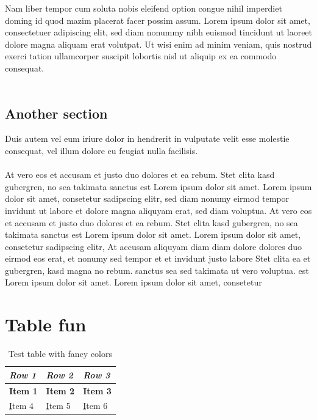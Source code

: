 \documentclass[bibliography=totoc,listof=totoc,BCOR=5mm,DIV=12,oneside]{scrbook}
\begin{document}
Nam liber tempor cum soluta nobis eleifend option congue nihil imperdiet doming id quod mazim placerat facer possim assum. Lorem ipsum dolor sit amet, consectetuer adipiscing elit, sed diam nonummy nibh euismod tincidunt ut laoreet dolore magna aliquam erat volutpat. Ut wisi enim ad minim veniam, quis nostrud exerci tation ullamcorper suscipit lobortis nisl ut aliquip ex ea commodo consequat.\\\\   

\section{Another section}

Duis autem vel eum iriure dolor in hendrerit in vulputate velit esse molestie consequat, vel illum dolore eu feugiat nulla facilisis.\\\\   

At vero eos et accusam et justo duo dolores et ea rebum. Stet clita kasd gubergren, no sea takimata sanctus est Lorem ipsum dolor sit amet. Lorem ipsum dolor sit amet, consetetur sadipscing elitr, sed diam nonumy eirmod tempor invidunt ut labore et dolore magna aliquyam erat, sed diam voluptua. At vero eos et accusam et justo duo dolores et ea rebum. Stet clita kasd gubergren, no sea takimata sanctus est Lorem ipsum dolor sit amet. Lorem ipsum dolor sit amet, consetetur sadipscing elitr, At accusam aliquyam diam diam dolore dolores duo eirmod eos erat, et nonumy sed tempor et et invidunt justo labore Stet clita ea et gubergren, kasd magna no rebum. sanctus sea sed takimata ut vero voluptua. est Lorem ipsum dolor sit amet. Lorem ipsum dolor sit amet, consetetur

\chapter{Table fun}

\begin{longtable}[c]{@{}l|l|l@{}}
\caption{Test table with fancy colors}
\label{my-table}\\
\rowcolor[HTML]{FFCCC9} 
\textit{Row 1} & \textit{Row 2} & \textit{Row 3} \\* \midrule
\endfirsthead
%
\endhead
%
{\color[HTML]{3531FF} \textbf{Item 1}} & {\color[HTML]{3531FF} \textbf{Item 2}} & {\color[HTML]{3531FF} \textbf{Item 3}} \\
{\color[HTML]{036400} {\ul Item 4}} & {\color[HTML]{036400} {\ul Item 5}} & {\color[HTML]{036400} {\ul Item 6}}
\end{longtable}
\end{document}
